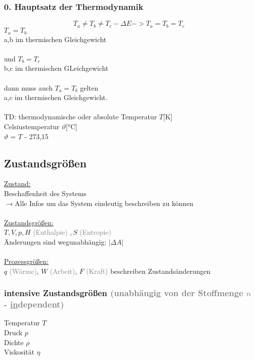 \documentclass[a4paper, fleqn]{article}
\begin{document}
\subsubsection{0. Hauptsatz der Thermodynamik}
\begin{equation*}
    T_a \neq T_b \neq T_c -\Delta E -> T_a = T_b = T_c
\end{equation*}
$T_a = T_b$\\
a,b im thermischen Gleichgewicht\\\\
und $T_b = T_c$\\
b,c im thermischen GLeichgewicht\\\\
dann muss auch $T_a = T_b$ gelten\\
a,c im thermischen Gleichgewicht.\\\\
TD: thermodynamische oder absolute Temperatur $T$[K]\\
Celsiustemperatur $\vartheta$[°C]\\
$\vartheta$ = $T$ - 273,15
\subsection{Zustandsgrößen}
\underline{Zustand:}\\
\hspace*{1cm}Beschaffenheit des Systems\\
\hspace*{1.5cm}$\rightarrow$Alle Infos um das System eindeutig beschreiben zu können\\\\
\underline{Zustandsgrößen:}\\
\hspace*{1cm} $T, V, p, H$ \textcolor{gray}{(Enthalpie)} $, S$ \textcolor{gray}{(Entropie)}\\
\hspace*{1cm} Änderungen sind wegunabhängig: $\left|\Delta A \right|$\\\\
\underline{Prozessgrößen:}\\
\hspace*{1cm} $q$ \textcolor{gray}{(Wärme)}, $W$ \textcolor{gray}{(Arbeit)}, $F$ \textcolor{gray}{(Kraft)} beschreiben Zustandsänderungen\\
\subsubsection{intensive Zustandsgrößen \textcolor{gray}{(unabhängig von der Stoffmenge $n$ - \underline{in}dependent)}}
Temperatur $T$\\
Druck $p$\\
Dichte $\rho$\\
Viskosität $\eta$\\
\end{document}
